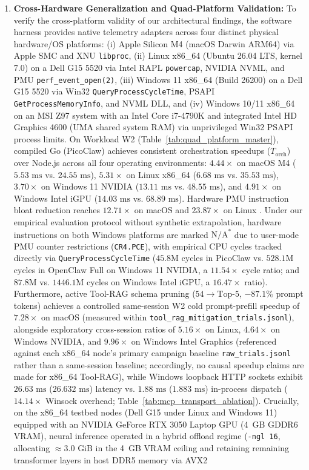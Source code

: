 \documentclass[11pt,a4paper]{article}
\begin{document}
\begin{enumerate}
    \item \textbf{Cross-Hardware Generalization and Quad-Platform Validation:} To verify the cross-platform validity of our architectural findings, the software harness provides native telemetry adapters across four distinct physical hardware/OS platforms: (i) Apple Silicon M4 (macOS Darwin ARM64) via Apple SMC and XNU \texttt{libproc}, (ii) Linux x86\_64 (Ubuntu 26.04 LTS, kernel 7.0) on a Dell G15 5520 via Intel RAPL \texttt{powercap}, NVIDIA NVML, and PMU \texttt{perf\_event\_open(2)}, (iii) Windows 11 x86\_64 (Build 26200) on a Dell G15 5520 via Win32 \texttt{QueryProcessCycleTime}, PSAPI \texttt{GetProcessMemoryInfo}, and NVML DLL, and (iv) Windows 10/11 x86\_64 on an MSI Z97 system with an Intel Core i7-4790K and integrated Intel HD Graphics 4600 (UMA shared system RAM) via unprivileged Win32 PSAPI process limits. On Workload W2 (Table~\ref{tab:quad_platform_master}), compiled Go (PicoClaw) achieves consistent orchestration speedups ($T_{\text{orch}}$) over Node.js across all four operating environments: $\mathbf{4.44\times}$ on macOS M4 ($5.53\text{ ms}$ vs. $24.55\text{ ms}$), $\mathbf{5.31\times}$ on Linux x86\_64 ($6.68\text{ ms}$ vs. $35.53\text{ ms}$), $\mathbf{3.70\times}$ on Windows 11 NVIDIA ($13.11\text{ ms}$ vs. $48.55\text{ ms}$), and $\mathbf{4.91\times}$ on Windows Intel iGPU ($14.03\text{ ms}$ vs. $68.89\text{ ms}$). Hardware PMU instruction bloat reduction reaches $\mathbf{12.71\times}$ on macOS and $\mathbf{23.87\times}$ on Linux \cite{weaver2013nondeterminism}. Under our empirical evaluation protocol without synthetic extrapolation, hardware instructions on both Windows platforms are marked $\text{N/A}^*$ due to user-mode PMU counter restrictions (\texttt{CR4.PCE}), with empirical CPU cycles tracked directly via \texttt{QueryProcessCycleTime} ($45.8\text{M}$ cycles in PicoClaw vs. $528.1\text{M}$ cycles in OpenClaw Full on Windows 11 NVIDIA, a $11.54\times$ cycle ratio; and $87.8\text{M}$ vs. $1446.1\text{M}$ cycles on Windows Intel iGPU, a $16.47\times$ ratio). Furthermore, active Tool-RAG schema pruning ($54 \rightarrow \text{Top-}5$, $-87.1\%$ prompt tokens) achieves a controlled same-session W2 cold prompt-prefill speedup of $\mathbf{7.28\times}$ on macOS (measured within \texttt{tool\_rag\_mitigation\_trials.jsonl}), alongside exploratory cross-session ratios of $\mathbf{5.16\times}$ on Linux, $\mathbf{4.64\times}$ on Windows NVIDIA, and $\mathbf{9.96\times}$ on Windows Intel Graphics (referenced against each x86\_64 node's primary campaign baseline \texttt{raw\_trials.jsonl} rather than a same-session baseline; accordingly, no causal speedup claims are made for x86\_64 Tool-RAG), while Windows loopback HTTP sockets exhibit $26.63\text{ ms}$ ($26.632\text{ ms}$) latency vs. $1.88\text{ ms}$ ($1.883\text{ ms}$) in-process dispatch ($14.14\times$ Winsock overhead; Table~\ref{tab:mcp_transport_ablation}). Crucially, on the x86\_64 testbed nodes (Dell G15 under Linux and Windows 11) equipped with an NVIDIA GeForce RTX 3050 Laptop GPU (4~GB GDDR6 VRAM), neural inference operated in a hybrid offload regime (\texttt{-ngl 16}, allocating $\approx 3.0\text{ GiB}$ in the 4~GB VRAM ceiling and retaining remaining transformer layers in host DDR5 memory via AVX2 
\end{enumerate}
\end{document}
